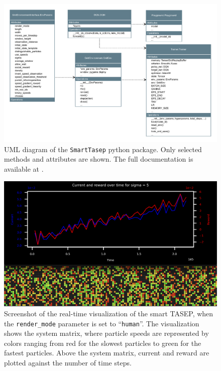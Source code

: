\begin{figure}[h]
    \centering
    \includegraphics[width=\textwidth]{uml.pdf}
    \caption{UML diagram of the \texttt{SmartTasep} python package. Only selected methods and attributes are shown. The full documentation is available at \cite{maertens_smarttasep_github_2023}.}
    \label{fig:implementation}
\end{figure}

\begin{figure}
    \centering
    \includegraphics[width=\textwidth]{smart_tasep_screenshot.png}
    \caption{Screenshot of the real-time visualization of the smart TASEP, when the \texttt{render\_mode} parameter is set to \enquote{\texttt{human}}. The visualization shows the system matrix, where particle speeds are represented by colors ranging from red for the slowest particles to green for the fastest particles. Above the system matrix, current and reward are plotted against the number of time steps.}
    \label{fig:smart-tasep-screenshot}
\end{figure}


